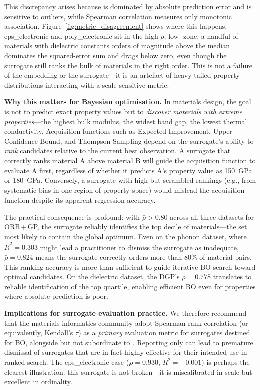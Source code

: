 This discrepancy arises because \Rtwo{} is dominated by absolute prediction error and is sensitive to outliers, while Spearman correlation measures only monotonic association.
Figure~\ref{fig:metric_disagreement} shows where this happens. eps\_electronic and poly\_electronic sit in the high-$\rho$, low-\Rtwo{} zone: a handful of materials with dielectric constants orders of magnitude above the median dominates the squared-error sum and drags \Rtwo{} below zero, even though the surrogate still ranks the bulk of materials in the right order.
This is not a failure of the embedding or the surrogate---it is an artefact of heavy-tailed property distributions interacting with a scale-sensitive metric.

\textbf{Why this matters for Bayesian optimisation.}
In materials design, the goal is not to predict exact property values but to \emph{discover materials with extreme properties}---the highest bulk modulus, the widest band gap, the lowest thermal conductivity.
Acquisition functions such as Expected Improvement, Upper Confidence Bound, and Thompson Sampling depend on the surrogate's ability to \emph{rank} candidates relative to the current best observation.
A surrogate that correctly ranks material A above material B will guide the acquisition function to evaluate A first, regardless of whether it predicts A's property value as 150~GPa or 180~GPa.
Conversely, a surrogate with high \Rtwo{} but scrambled rankings (e.g., from systematic bias in one region of property space) would mislead the acquisition function despite its apparent regression accuracy.

The practical consequence is profound: with $\bar{\rho} > 0.80$ across all three datasets for ORB\,+\,GP, the surrogate reliably identifies the top decile of materials---the set most likely to contain the global optimum.
Even on the phonon dataset, where $\bar{R}^2 = 0.303$ might lead a practitioner to dismiss the surrogate as inadequate, $\bar{\rho} = 0.824$ means the surrogate correctly orders more than 80\% of material pairs.
This ranking accuracy is more than sufficient to guide iterative BO search toward optimal candidates.
On the dielectric dataset, the DGP's $\bar{\rho} = 0.778$ translates to reliable identification of the top quartile, enabling efficient BO even for properties where absolute prediction is poor.

\textbf{Implications for surrogate evaluation practice.}
We therefore recommend that the materials informatics community adopt Spearman rank correlation (or equivalently, Kendall's $\tau$) as a \emph{primary} evaluation metric for surrogates destined for BO, alongside but not subordinate to \Rtwo{}.
Reporting only \Rtwo{} can lead to premature dismissal of surrogates that are in fact highly effective for their intended use in ranked search.
The eps\_electronic case ($\rho = 0.930$, $R^2 = -0.001$) is perhaps the clearest illustration: this surrogate is not broken---it is miscalibrated in scale but excellent in ordinality.

